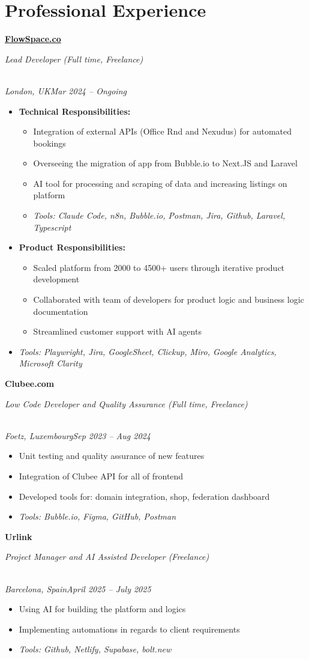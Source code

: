 \documentclass[a4paper,10pt]{article}
\newcommand{\role}[4]{\vspace{3pt}\noindent\hspace{0.6em}\parbox[t]{0.38\textwidth}{\raggedright\textbf{#1}}\hfill\parbox[t]{0.58\textwidth}{\raggedleft\textit{#2}}\\{\textit{#3}\hfill\textit{#4}}\vspace{1pt}}
\begin{document}
\section{Professional Experience}
\role{\href{https://flowspace.co}{FlowSpace.co}}{Lead Developer (Full time, Freelance)}{London, UK}{Mar 2024 -- Ongoing}
\begin{itemize}
\item \textbf{Technical Responsibilities:}
\begin{itemize}[label=--]
\item Integration of external APIs (Office Rnd and Nexudus) for automated bookings
\item Overseeing the migration of app from Bubble.io to Next.JS and Laravel
\item AI tool for processing and scraping of data and increasing listings on platform
\item \textit{Tools: Claude Code, n8n, Bubble.io, Postman, Jira, Github, Laravel, Typescript}
\end{itemize}
\item \textbf{Product Responsibilities:}
\begin{itemize}[label=--]
\item Scaled platform from 2000 to 4500+ users through iterative product development
\item Collaborated with team of developers for product logic and business logic documentation
\item Streamlined customer support with AI agents
\end{itemize}
\item \textit{Tools: Playwright, Jira, GoogleSheet, Clickup, Miro, Google Analytics, Microsoft Clarity}
\end{itemize}

\role{Clubee.com}{Low Code Developer and Quality Assurance (Full time, Freelance)}{Foetz, Luxembourg}{Sep 2023 -- Aug 2024}
\begin{itemize}
\item Unit testing and quality assurance of new features
\item Integration of Clubee API for all of frontend
\item Developed tools for: domain integration, shop, federation dashboard
\item \textit{Tools: Bubble.io, Figma, GitHub, Postman}
\end{itemize}

\role{Urlink}{Project Manager and AI Assisted Developer (Freelance)}{Barcelona, Spain}{April 2025 -- July 2025}
\begin{itemize}
\item Using AI for building the platform and logics
\item Implementing automations in regards to client requirements
\item \textit{Tools: Github, Netlify, Supabase, bolt.new}
\end{itemize}
\end{document}
